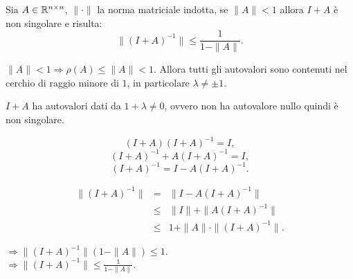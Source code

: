 \begin{teo}
Sia $A \in \mathbb{R}^{n \times n}$, $\|\cdot\|$ la norma matriciale indotta, se
$\|A\| < 1$ allora $I + A$ è non singolare e risulta:
\[\|(I+A)^{-1}\| \leq \frac{1}{1 - \|A\|}.\]
\end{teo}
\begin{dimo}
$\|A\| < 1 \Rightarrow \rho(A) \leq \|A\| < 1$.
Allora tutti gli autovalori sono contenuti nel cerchio di raggio minore di
$1$, in particolare $\lambda \neq \pm 1$.

$I + A$ ha autovalori dati da $1 + \lambda \neq 0$, ovvero non ha autovalore
nullo quindi è non singolare.


\[(I + A)(I+A)^{-1} = I,\]
\[(I + A)^{-1} + A(I + A)^{-1} = I,\]
\[(I + A)^{-1} = I - A(I + A)^{-1}.\]

\[\begin{array}{lcl}
\|(I + A)^{-1}\| & = & \|I - A(I + A)^{-1}\| \\
& \leq & \|I\| + \|A(I + A)^{-1}\| \\
& \leq & 1 + \|A\| \cdot \|(I + A)^{-1}\|.
\end{array}\]

$\Rightarrow \|(I + A)^{-1}\|(1 - \|A\|) \leq 1.$\\

$\Rightarrow \|(I + A)^{-1}\| \leq \frac{1}{1 - \|A\|}.$
\end{dimo}

